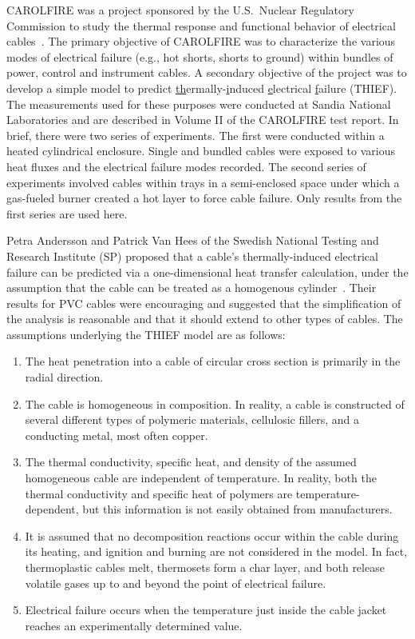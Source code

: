 CAROLFIRE was a project sponsored by the U.S.~Nuclear Regulatory Commission to study the thermal response and functional behavior of electrical cables~\cite{CAROLFIRE}. The primary objective of CAROLFIRE was to characterize the various modes of electrical failure (e.g., hot shorts, shorts to ground) within bundles of power, control and instrument cables. A secondary objective of the project was to develop a simple model to predict \underline{th}ermally-\underline{i}nduced \underline{e}lectrical \underline{f}ailure (THIEF). The measurements used for these purposes were conducted at Sandia National Laboratories and are described in Volume II of the CAROLFIRE test report. In brief, there were two series of experiments. The first were conducted within a heated cylindrical enclosure. Single and bundled cables were exposed to various heat fluxes and the electrical failure modes recorded. The second series of experiments involved cables within trays in a semi-enclosed space under which a gas-fueled burner created a hot layer to force cable failure. Only results from the first series are used here.

Petra Andersson and Patrick Van Hees of the Swedish National Testing and Research Institute (SP) proposed that a cable's thermally-induced electrical failure can be predicted via a one-dimensional heat transfer calculation, under the assumption that the cable can be treated as a homogenous cylinder~\cite{Andersson:2005}. Their results for PVC cables were encouraging and suggested that the simplification of the analysis is reasonable and that it should extend to other types of cables. The assumptions underlying the THIEF model are as follows:
\begin{enumerate}
\item The heat penetration into a cable of circular cross section is primarily in the radial direction.
\item The cable is homogeneous in composition. In reality, a cable is constructed of several different types of polymeric materials, cellulosic fillers, and a conducting metal, most often copper.
\item The thermal conductivity, specific heat, and density of the assumed homogeneous cable are independent of temperature. In reality, both the thermal conductivity and specific heat of polymers are temperature-dependent, but this information is not easily obtained from manufacturers.
\item It is assumed that no decomposition reactions occur within the cable during its heating, and ignition and burning are not considered in the model. In fact, thermoplastic cables melt, thermosets form a char layer, and both release volatile gases up to and beyond the point of electrical failure.
\item Electrical failure occurs when the temperature just inside the cable jacket reaches an experimentally determined value.
\end{enumerate}


